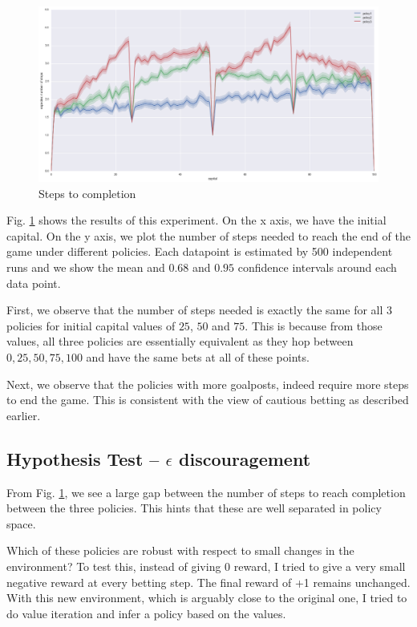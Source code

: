 \documentclass{article}
\begin{document}
\begin{figure}
    \centering
    \includegraphics[width=\textwidth]{figure_2}
    \caption{Steps to completion}
    \label{steps}
\end{figure}

Fig. \ref{steps} shows the results of this experiment. On the x axis, we have the initial capital. On the y axis, we plot the number of steps needed to reach the end of the game under different policies. Each datapoint is estimated by 500 independent runs and we show the mean and $0.68$ and $0.95$ confidence intervals around each data point.

First, we observe that the number of steps needed is exactly the same for all 3 policies for initial capital values of $25$, $50$ and $75$. This is because from those values, all three policies are essentially equivalent as they hop between ${0, 25, 50, 75, 100}$ and have the same bets at all of these points.

Next, we observe that the policies with more goalposts, indeed require more steps to end the game. This is consistent with the view of cautious betting as described earlier.

\subsection{Hypothesis Test -- $\epsilon$ discouragement}

From Fig. \ref{steps}, we see a large gap between the number of steps to reach completion between the three policies. This hints that these are well separated in policy space.

Which of these policies are robust with respect to small changes in the environment? To test this, instead of giving $0$ reward, I tried to give a very small negative reward at every betting step. The final reward of +1 remains unchanged. With this new environment, which is arguably close to the original one, I tried to do value iteration and infer a policy based on the values.
\end{document}
